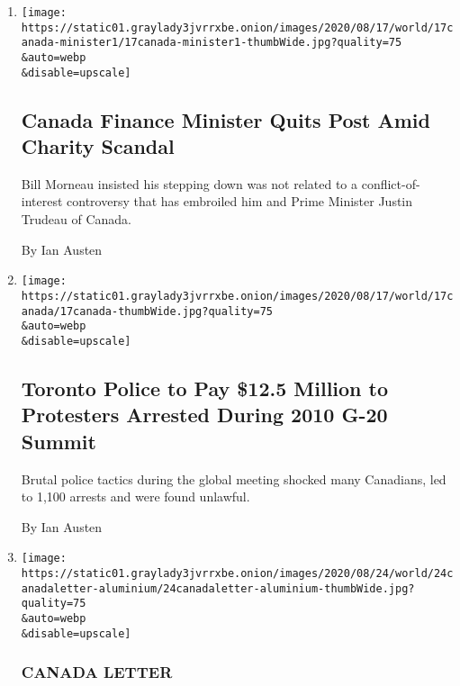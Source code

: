 \begin{enumerate}
\def\labelenumi{\arabic{enumi}.}
\item
  \href{/2020/08/17/world/canada/finance-minister-resigns-trudeau.html}{}

  \texttt{[image: https://static01.graylady3jvrrxbe.onion/images/2020/08/17/world/17canada-minister1/17canada-minister1-thumbWide.jpg?quality=75\\\&auto=webp\\\&disable=upscale]}

  \hypertarget{canada-finance-minister-quits-post-amid-charity-scandal}{%
  \subsection{Canada Finance Minister Quits Post Amid Charity
  Scandal}\label{canada-finance-minister-quits-post-amid-charity-scandal}}

  Bill Morneau insisted his stepping down was not related to a
  conflict-of-interest controversy that has embroiled him and Prime
  Minister Justin Trudeau of Canada.

  By Ian Austen
\item
  \href{/2020/08/17/world/canada/toronto-g20-settlement.html}{}

  \texttt{[image: https://static01.graylady3jvrrxbe.onion/images/2020/08/17/world/17canada/17canada-thumbWide.jpg?quality=75\\\&auto=webp\\\&disable=upscale]}

  \hypertarget{toronto-police-to-pay-125-million-to-protesters-arrested-during-2010-g-20-summit}{%
  \subsection{Toronto Police to Pay \$12.5 Million to Protesters
  Arrested During 2010 G-20
  Summit}\label{toronto-police-to-pay-125-million-to-protesters-arrested-during-2010-g-20-summit}}

  Brutal police tactics during the global meeting shocked many
  Canadians, led to 1,100 arrests and were found unlawful.

  By Ian Austen
\item
  \href{/2020/08/14/world/canada/trump-canada-aluminum-exports.html}{}

  \texttt{[image: https://static01.graylady3jvrrxbe.onion/images/2020/08/24/world/24canadaletter-aluminium/24canadaletter-aluminium-thumbWide.jpg?quality=75\\\&auto=webp\\\&disable=upscale]}

  \hypertarget{canada-letter}{%
  \subsubsection{CANADA LETTER}\label{canada-letter}}


\end{enumerate}
